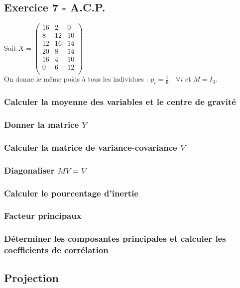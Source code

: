 \documentclass[a4paper, 12pt]{article}
\begin{document}
\subsection{Exercice 7 - A.C.P.}
\begin{flushleft}
Soit $X = 
\begin{pmatrix}
16 & 2 & 0 \\
8 & 12 & 10 \\
12 & 16 & 14 \\
20 & 8 & 14 \\
16 & 4 & 10 \\
0 & 6 & 12 \\
\end{pmatrix}
$ \\

On donne le même poids à tous les individues : $p_i = \frac{1}{6} \quad \forall i$ et $M = I_3$.
\end{flushleft}


\subsubsection{Calculer la moyenne des variables et le centre de gravité}
\subsubsection{Donner la matrice $Y$}
\subsubsection{Calculer la matrice de variance-covariance $V$}
\subsubsection{Diagonaliser $MV = V$}
\subsubsection{Calculer le pourcentage d'inertie}
\subsubsection{Facteur principaux}
\subsubsection{Déterminer les composantes principales et calculer les coefficients de corrélation}







\subsection{Projection}
\end{document}
